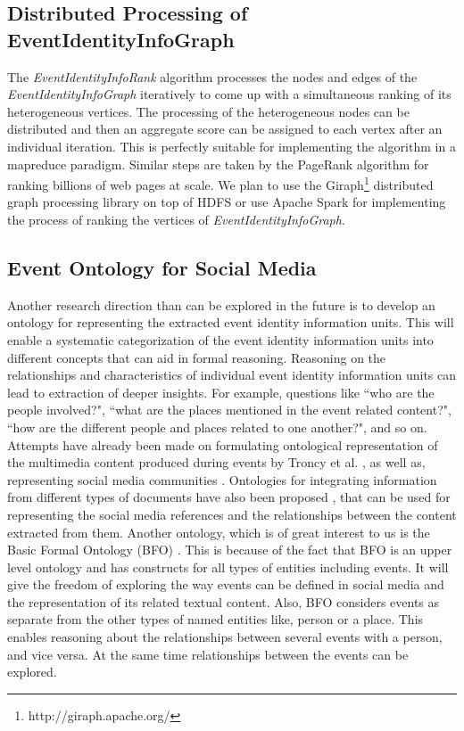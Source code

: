 \subsection{Distributed Processing of EventIdentityInfoGraph}
The \textit{EventIdentityInfoRank} algorithm processes the nodes and edges of the \textit{EventIdentityInfoGraph} iteratively to come up with a simultaneous ranking of its heterogeneous vertices. The processing of the heterogeneous nodes can be distributed and then an aggregate score can be assigned to each vertex after an individual iteration. This is perfectly suitable for implementing the algorithm in a mapreduce paradigm. Similar steps are taken by the PageRank algorithm for ranking billions of web pages at scale. We plan to use the Giraph\footnote{http://giraph.apache.org/} distributed graph processing library on top of HDFS or use Apache Spark for implementing the process of ranking the vertices of \textit{EventIdentityInfoGraph}.

\subsection{Event Ontology for Social Media}
Another research direction than can be explored in the future is to develop  an ontology for representing the extracted event identity information units. This will enable a systematic categorization of the event identity information units into different concepts that can aid in formal reasoning. Reasoning on the relationships and characteristics of individual event identity information units can lead to extraction of deeper insights. For example, questions like ``who are the people involved?", ``what are the places mentioned in the event related content?", ``how are the different people and places related to one another?", and so on. Attempts have already been made on formulating ontological representation of the multimedia content produced during events by Troncy et al. \cite{troncy2010linking}, as well as, representing social media communities \cite{breslinsemantically}. Ontologies for integrating information from different types of documents have also been proposed \cite{doerr2006towards}, that can be used for representing the social media references and the relationships between the content extracted from them. Another ontology, which is of great interest to us is the Basic Formal Ontology (BFO) \cite{smith2002basic}. This is because of the fact that BFO is an upper level ontology and has constructs for all types of entities including events. It will give the freedom of exploring the way events can be defined in social media and the representation of its related textual content. Also, BFO considers events as separate from the other types of named entities like, person or a place. This enables reasoning about the relationships between several events with a person, and vice versa. At the same time relationships between the events can be explored.